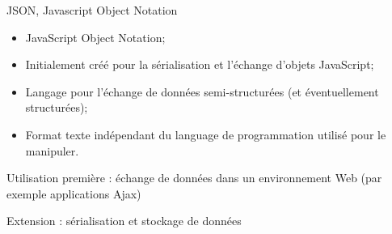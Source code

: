 \begin{frame}{JSON, Javascript Object Notation}

\begin{itemize}
\item JavaScript Object Notation;
\item Initialement créé pour la sérialisation et l'échange d'objets JavaScript;
\item Langage pour l'échange de données semi-structurées (et éventuellement structurées);
\item Format texte indépendant du language de programmation utilisé pour le manipuler.
\end{itemize}

\vfill 

Utilisation première : échange de données dans un environnement Web (par exemple applications Ajax)\\

\vfill

Extension : sérialisation et stockage de données 

\end{frame}



